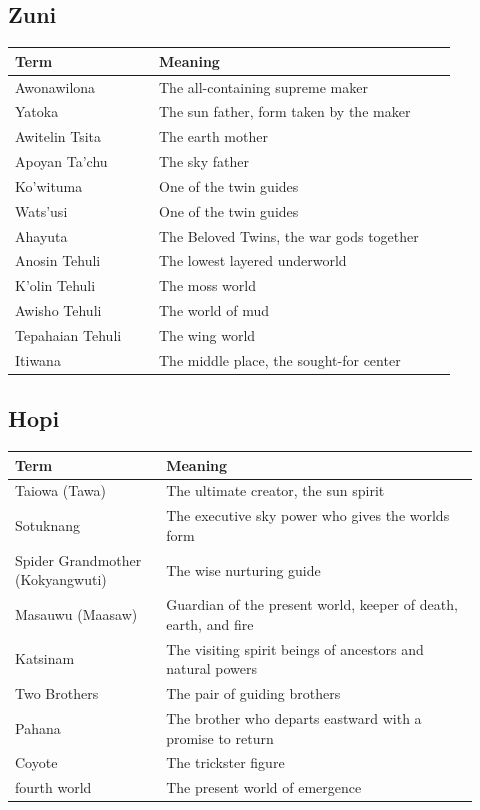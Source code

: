 \subsection{Zuni}

\begin{longtable}{L{0.30\linewidth} L{0.62\linewidth}}
\toprule
\textbf{Term} & \textbf{Meaning} \\
\midrule
\endhead
Awonawilona & The all-containing supreme maker \\
Yatoka & The sun father, form taken by the maker \\
Awitelin Tsita & The earth mother \\
Apoyan Ta'chu & The sky father \\
Ko'wituma & One of the twin guides \\
Wats'usi & One of the twin guides \\
Ahayuta & The Beloved Twins, the war gods together \\
Anosin Tehuli & The lowest layered underworld \\
K'olin Tehuli & The moss world \\
Awisho Tehuli & The world of mud \\
Tepahaian Tehuli & The wing world \\
Itiwana & The middle place, the sought-for center \\
\bottomrule
\end{longtable}

\subsection{Hopi}

\begin{longtable}{L{0.30\linewidth} L{0.62\linewidth}}
\toprule
\textbf{Term} & \textbf{Meaning} \\
\midrule
\endhead
Taiowa (Tawa) & The ultimate creator, the sun spirit \\
Sotuknang & The executive sky power who gives the worlds form \\
Spider Grandmother (Kokyangwuti) & The wise nurturing guide \\
Masauwu (Maasaw) & Guardian of the present world, keeper of death, earth, and fire \\
Katsinam & The visiting spirit beings of ancestors and natural powers \\
Two Brothers & The pair of guiding brothers \\
Pahana & The brother who departs eastward with a promise to return \\
Coyote & The trickster figure \\
fourth world & The present world of emergence \\
\bottomrule
\end{longtable}

